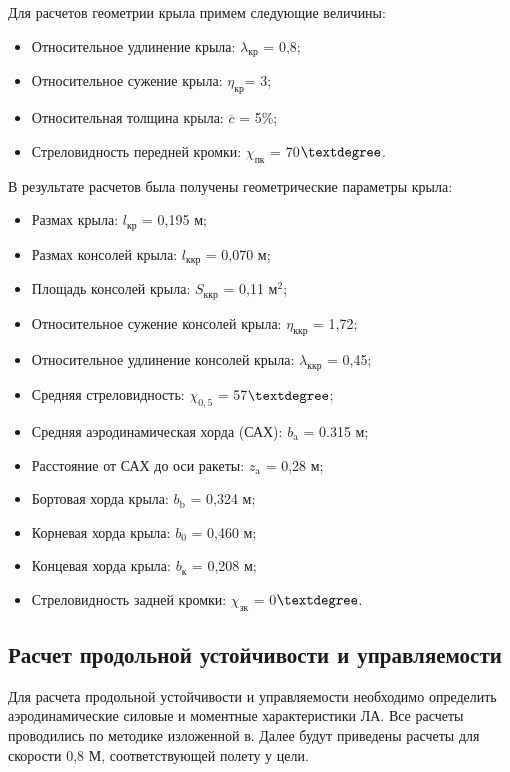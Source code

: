 Для расчетов геометрии крыла примем следующие величины:
\begin{itemize}
	\item Относительное удлинение крыла:		$	\lambda_\text{кр} $ = 0,8;
	\item Относительное сужение крыла:			$	\eta_\text{кр} $= 3;
	\item Относительная толщина крыла:			$	\overline{c} $ = 5\%;
	\item Стреловидность передней кромки:		$	\chi_\text{пк}$ = 70$\textdegree$.
\end{itemize}

В результате расчетов была получены геометрические параметры крыла:
\begin{itemize}
	\item Размах крыла:							$l_\text{кр}$ = 0,195 м;
	\item Размах консолей крыла:					$l_\text{ккр}$ = 0,070 м;
	\item Площадь консолей крыла:					$S_\text{ккр}$ = 0,11 $\text{м}^2$;
	\item Относительное сужение консолей крыла:	$	\eta_\text{ккр}$ = 1,72;
	\item Относительное удлинение консолей крыла:	$	\lambda_\text{ккр}$ = 0,45;
	\item Средняя стреловидность:					$\chi_{0,5}$ = 57$\textdegree$;
	\item Средняя аэродинамическая хорда (САХ):	$	b_\text{a}$ = 0.315 м;
	\item Расстояние от САХ до оси ракеты:			$	z_\text{a}$ = 0,28 м;
	\item Бортовая хорда крыла:					$	b_\text{b}$ = 0,324 м;
	\item Корневая хорда крыла:					$	b_\text{0}$ = 0,460 м;
	\item Концевая хорда крыла:					$	b_\text{к}$ = 0,208 м;
	\item Стреловидность задней кромки:			$	\chi_\text{зк}$ = 0$\textdegree$.

\end{itemize}

\subsection{Расчет продольной устойчивости и управляемости}
Для расчета продольной устойчивости и управляемости необходимо определить аэродинамические силовые и моментные характеристики ЛА. Все расчеты проводились по методике изложенной в. Далее будут приведены расчеты для скорости 0,8 М, соответствующей полету у цели.



